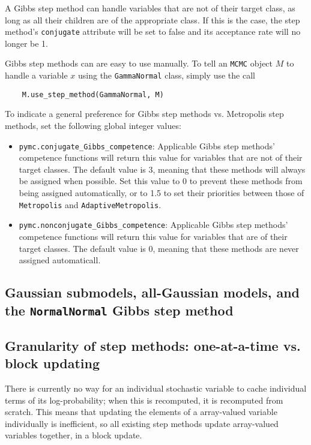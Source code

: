A Gibbs step method can handle variables that are not of their target class, as long as all their children are of the appropriate class. If this is the case, the step method's \texttt{conjugate} attribute will be set to false and its acceptance rate will no longer be 1.

Gibbs step methods can are easy to use manually. To tell an \texttt{MCMC} object $M$ to handle a variable $x$ using the \texttt{GammaNormal} class, simply use the call
\begin{verbatim}
    M.use_step_method(GammaNormal, M)
\end{verbatim}

To indicate a general preference for Gibbs step methods vs. Metropolis step methods, set the following global integer values:
\begin{itemize}
    \item \texttt{pymc.conjugate_Gibbs_competence}: Applicable Gibbs step methods' competence functions will return this value for variables that are not of their target classes. The default value is 3, meaning that these methods will always be assigned when possible. Set this value to 0 to prevent these methods from being assigned automatically, or to 1.5 to set their priorities between those of \texttt{Metropolis} and \texttt{AdaptiveMetropolis}.
    \item \texttt{pymc.nonconjugate_Gibbs_competence}: Applicable Gibbs step methods' competence functions will return this value for variables that are of their target classes. The default value is 0, meaning that these methods are never assigned automaticall.
\end{itemize}


\subsection{Gaussian submodels, all-Gaussian models, and the \texttt{NormalNormal} Gibbs step method}

\subsection{Granularity of step methods: one-at-a-time vs. block updating} 
There is currently no way for an individual stochastic variable to cache individual terms of its log-probability; when this is recomputed, it is recomputed from scratch. This means that updating the elements of a array-valued variable individually is inefficient, so all existing step methods update array-valued variables together, in a block update.

